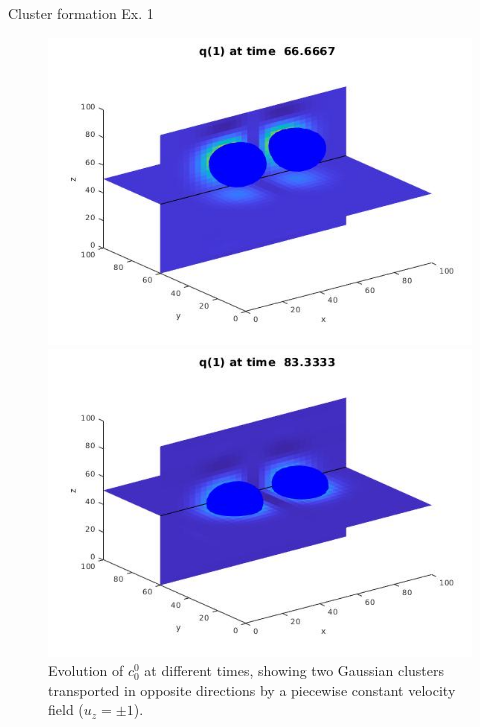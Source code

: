 \begin{frame}{Cluster formation Ex. 1}
\begin{figure}[H]
\begin{minipage}{0.4\textwidth}
    			\end{minipage}
    		\end{figure}
    		\begin{figure}[H]
    			\centering
    			\begin{minipage}{0.4\textwidth}
    				\includegraphics[scale=0.21]{Bilder_3D/2Glocken_uzk_2Cluster_t=66}
    			\end{minipage}
    			\hfill 
    			\begin{minipage}{0.4\textwidth}
    				\includegraphics[scale=0.21]{Bilder_3D/2Glocken_uzk_2Cluster_t=83}
    			\end{minipage}
    			\caption{Evolution of $c^0_0$ at different times, showing two Gaussian clusters transported in opposite directions by a piecewise constant velocity field ($u_z = \pm 1$).}
    		\end{figure}
    \end{frame}

